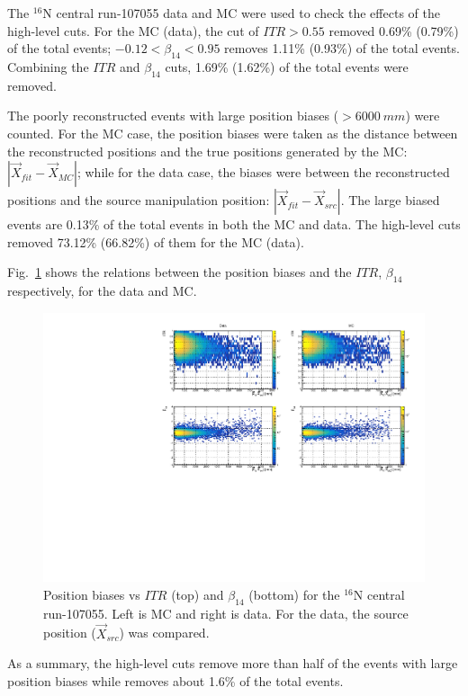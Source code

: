 The $^{16}$N central run-107055 data and MC were used to check the effects of the high-level cuts. For the MC (data), the cut of $ITR>0.55$ removed 0.69\% (0.79\%) of the total events; $-0.12<\beta_{14}<0.95$ removes 1.11\% (0.93\%) of the total events. Combining the $ITR$ and $\beta_{14}$ cuts, 1.69\% (1.62\%) of the total events were removed.

The poorly reconstructed events with large position biases ($>6000~mm$) were counted.
For the MC case, the position biases were taken as the distance between the reconstructed positions and the true positions generated by the MC: $|\vec{X}_{fit}-\vec{X}_{MC}|$; while for the data case, the biases were between the reconstructed positions and the source manipulation position: $|\vec{X}_{fit}-\vec{X}_{src}|$. The large biased events are 0.13\% of the total events in both the MC and data. The high-level cuts removed 73.12\% (66.82\%) of them for the MC (data).

Fig.~\ref{n16_highLevelCut} shows the relations between the position biases and the $ITR$, $\beta_{14}$ respectively, for the data and MC.
\begin{figure}
	\centering
	\includegraphics[width=14cm]{N16_107055_highLevelCuts.pdf}
	\caption{Position biases vs $ITR$ (top) and $\beta_{14}$ (bottom) for the $^{16}$N central run-107055. Left is MC and right is data. For the data, the source position ($\vec{X}_{src}$) was compared.}
	\label{n16_highLevelCut}
\end{figure}

As a summary, the high-level cuts remove more than half of the events with large position biases while removes about 1.6\% of the total events. 

